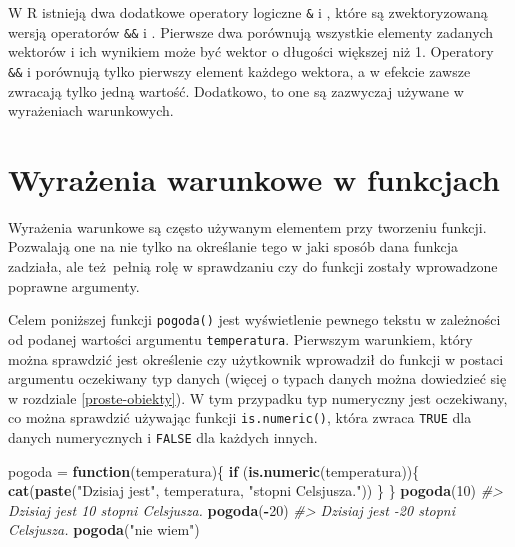 \documentclass[paper=6in:9in,pagesize=pdftex,headinclude=on,footinclude=on,10pt]{scrbook}
\newenvironment{Shaded}{\begin{snugshade}}{\end{snugshade}}
\newcommand{\CommentTok}[1]{\textcolor[rgb]{0.56,0.35,0.01}{\textit{#1}}}
\newcommand{\ControlFlowTok}[1]{\textcolor[rgb]{0.13,0.29,0.53}{\textbf{#1}}}
\newcommand{\DecValTok}[1]{\textcolor[rgb]{0.00,0.00,0.81}{#1}}
\newcommand{\KeywordTok}[1]{\textcolor[rgb]{0.13,0.29,0.53}{\textbf{#1}}}
\newcommand{\NormalTok}[1]{#1}
\newcommand{\OperatorTok}[1]{\textcolor[rgb]{0.81,0.36,0.00}{\textbf{#1}}}
\newcommand{\StringTok}[1]{\textcolor[rgb]{0.31,0.60,0.02}{#1}}
\let\BeginKnitrBlock\begin \let\EndKnitrBlock\end
\begin{document}
\BeginKnitrBlock{rmdinfo}
W R istnieją dwa dodatkowe operatory logiczne \texttt{\&} i \texttt{\textbar{}}, które są zwektoryzowaną wersją operatorów \texttt{\&\&} i \texttt{\textbar{}\textbar{}}.
Pierwsze dwa porównują wszystkie elementy zadanych wektorów i ich wynikiem może być wektor o długości większej niż 1.
Operatory \texttt{\&\&} i \texttt{\textbar{}\textbar{}} porównują tylko pierwszy element każdego wektora, a w efekcie zawsze zwracają tylko jedną wartość.
Dodatkowo, to one są zazwyczaj używane w wyrażeniach warunkowych.
\EndKnitrBlock{rmdinfo}

\hypertarget{wwwf}{%
\section{Wyrażenia warunkowe w funkcjach}\label{wwwf}}

Wyrażenia warunkowe są często używanym elementem przy tworzeniu funkcji.
Pozwalają one na nie tylko na określanie tego w jaki sposób dana funkcja zadziała, ale też~pełnią rolę w sprawdzaniu czy do funkcji zostały wprowadzone poprawne argumenty.

Celem poniższej funkcji \texttt{pogoda()} jest wyświetlenie pewnego tekstu w zależności od podanej wartości argumentu \texttt{temperatura}.
Pierwszym warunkiem, który można sprawdzić jest określenie czy użytkownik wprowadził do funkcji w postaci argumentu oczekiwany typ danych (więcej o typach danych można dowiedzieć się w rozdziale \ref{proste-obiekty}).
W tym przypadku typ numeryczny jest oczekiwany, co można sprawdzić używając funkcji \texttt{is.numeric()}, która zwraca \texttt{TRUE} dla danych numerycznych i \texttt{FALSE} dla każdych innych.

\begin{Shaded}
\begin{Highlighting}[]
\NormalTok{pogoda =}\StringTok{ }\ControlFlowTok{function}\NormalTok{(temperatura)\{}
  \ControlFlowTok{if}\NormalTok{ (}\KeywordTok{is.numeric}\NormalTok{(temperatura))\{}
    \KeywordTok{cat}\NormalTok{(}\KeywordTok{paste}\NormalTok{(}\StringTok{"Dzisiaj jest"}\NormalTok{, temperatura, }\StringTok{"stopni Celsjusza."}\NormalTok{))}
\NormalTok{  \}}
\NormalTok{\}}
\KeywordTok{pogoda}\NormalTok{(}\DecValTok{10}\NormalTok{)}
\CommentTok{#> Dzisiaj jest 10 stopni Celsjusza.}
\KeywordTok{pogoda}\NormalTok{(}\OperatorTok{-}\DecValTok{20}\NormalTok{)}
\CommentTok{#> Dzisiaj jest -20 stopni Celsjusza.}
\KeywordTok{pogoda}\NormalTok{(}\StringTok{"nie wiem"}\NormalTok{)}
\end{Highlighting}
\end{Shaded}
\end{document}
